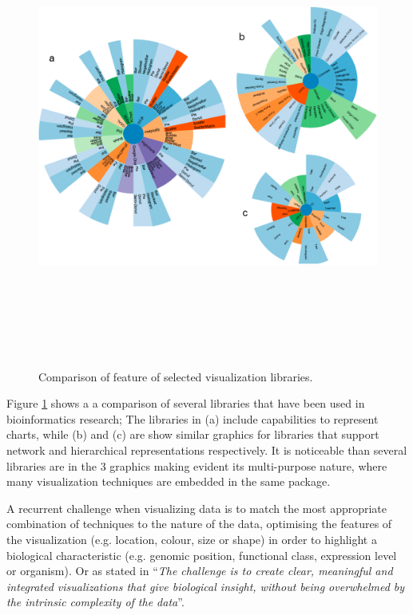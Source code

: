 \begin{figure}  
\includegraphics[height=6in,angle=90]{figures/vis_libs.png}
\caption[Comparison of feature of selected visualization libraries.]{Comparison of feature of selected visualization libraries.
\label{fig:vis_libs}}
\end{figure}

Figure \ref{fig:vis_libs} shows a a comparison of several libraries that have been used in bioinformatics research; The libraries in (a) include capabilities to represent charts, while (b) and (c) are show similar graphics for libraries that support network and hierarchical representations respectively. It is noticeable than several libraries are in the 3 graphics making evident its multi-purpose nature, where many visualization techniques are embedded in the same package.

A recurrent challenge when visualizing data is to match the most appropriate combination of techniques to the nature of the data, optimising the features of the visualization (e.g. location, colour, size or shape) in order to highlight a biological characteristic (e.g. genomic position, functional class, expression level or organism). Or as stated in \cite{GEH2010} ``\emph{The challenge is to create clear, meaningful and integrated visualizations that give biological insight, without being overwhelmed by the intrinsic complexity of the data}''.

